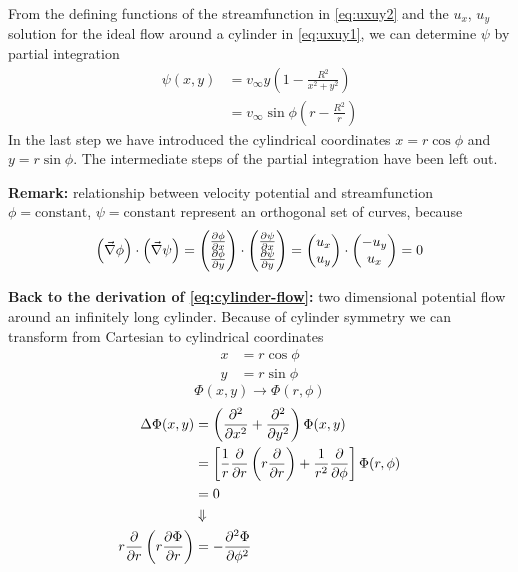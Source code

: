 From the defining functions of the streamfunction in \eqref{eq:uxuy2} and the $u_x$, $u_y$ solution for the ideal flow around a cylinder in \eqref{eq:uxuy1}, we can determine $\psi$ by partial integration
\begin{align}
\psi(x,y) &= v_\infty y\left(1-\frac{R^2}{x^2+y^2}\right)\\
&= v_\infty \sin\phi\left(r-\frac{R^2}{r}\right)
\end{align}
In the last step we have introduced the cylindrical coordinates $x=r\cos\phi$ and $y = r\sin\phi$. The intermediate steps of the partial integration have been left out.
\begin{framed}
\textbf{Remark:} relationship between velocity potential and streamfunction\newline $\phi=\mathrm{constant}$, $\psi=\mathrm{constant}$ represent an orthogonal set of curves, because
\begin{equation}
\left(\vec{\nabla}\phi\right)\cdot\left(\vec{\nabla}\psi\right) =
\begin{pmatrix}
\frac{\partial \phi}{\partial x} \\ \frac{\partial \phi}{\partial y}
\end{pmatrix} \cdot
\begin{pmatrix}
\frac{\partial \psi}{\partial x} \\ \frac{\partial \psi}{\partial y}
\end{pmatrix} =
\begin{pmatrix}
u_x \\ u_y
\end{pmatrix}\cdot
\begin{pmatrix}
-u_y \\ u_x
\end{pmatrix} = 0
\end{equation}
\end{framed}
\textbf{Back to the derivation of \eqref{eq:cylinder-flow}:} two dimensional potential flow around an infinitely long cylinder. Because of cylinder symmetry we can transform from Cartesian to cylindrical coordinates
\begin{align}
x &= r\cos\phi\\
y &= r\sin\phi
\end{align}
\begin{equation}
\Phi(x,y) \rightarrow \Phi(r,\phi)
\end{equation}
\begin{align}
\Delta\Phi(x,y) &= \left(\frac{\partial^2 }{\partial x^2}+\frac{\partial^2 }{\partial y^2}\right)\Phi(x,y) \\
&= \left[\frac{1}{r}\frac{\partial }{\partial r}\left(r\frac{\partial }{\partial r}\right) + \frac{1}{r^2}\frac{\partial }{\partial \phi}\right]\Phi(r,\phi)\\
&= 0\\
&\Downarrow\notag\\
r\frac{\partial }{\partial r}\left(r\frac{\partial \Phi}{\partial r}\right) &= -\frac{\partial^2 \Phi}{\partial \phi^2}
\end{align}

